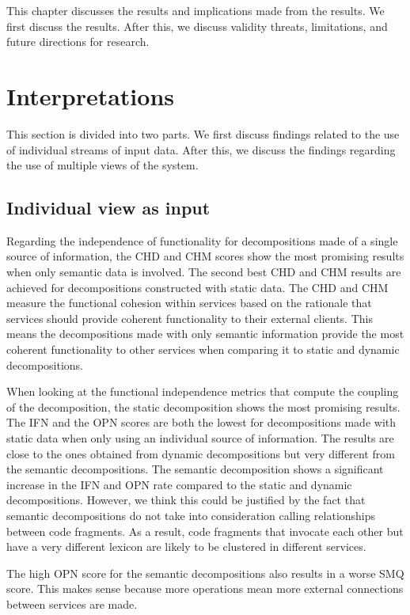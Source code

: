 This chapter discusses the results and implications made from the results. We first discuss the results. After this, we discuss validity threats, limitations, and future directions for research.\par

\section{Interpretations}
This section is divided into two parts. We first discuss findings related to the use of individual streams of input data. After this, we discuss the findings regarding the use of multiple views of the system.

\subsection{Individual view as input}
Regarding the independence of functionality for decompositions made of a single source of information, the CHD and CHM scores show the most promising results when only semantic data is involved. The second best CHD and CHM results are achieved for decompositions constructed with static data. The CHD and CHM measure the functional cohesion within services based on the rationale that services should provide coherent functionality to their external clients. This means the decompositions made with only semantic information provide the most coherent functionality to other services when comparing it to static and dynamic decompositions.\par

When looking at the functional independence metrics that compute the coupling of the decomposition, the static decomposition shows the most promising results. The IFN and the OPN scores are both the lowest for decompositions made with static data when only using an individual source of information. The results are close to the ones obtained from dynamic decompositions but very different from the semantic decompositions. The semantic decomposition shows a significant increase in the IFN and OPN rate compared to the static and dynamic decompositions. However, we think this could be justified by the fact that semantic decompositions do not take into consideration calling relationships between code fragments. As a result, code fragments that invocate each other but have a very different lexicon are likely to be clustered in different services. \par

The high OPN score for the semantic decompositions also results in a worse SMQ score. This makes sense because more operations mean more external connections between services are made.\par

